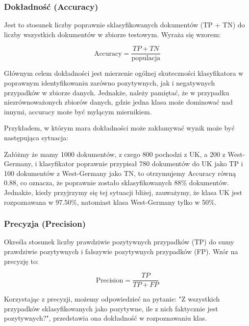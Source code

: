 \documentclass{article}
\begin{document}
\subsubsection*{Dokładność (Accuracy)}
 
Jest to stosunek liczby poprawnie sklasyfikowanych dokumentów (TP + TN) do liczby wszystkich dokumentów w zbiorze testowym. Wyraża się wzorem: \newline
 
\begin{equation}
    \text{Accuracy} = \frac{TP + TN}{\text{populacja}}
\end{equation}


\noindent Głównym celem dokładności jest mierzenie ogólnej skuteczności klasyfikatora w poprawnym identyfikowaniu zarówno pozytywnych, jak i negatywnych przypadków w zbiorze danych. Jednakże, należy pamiętać, że w przypadku niezrównoważonych zbiorów danych, gdzie jedna klasa może dominować nad innymi, accuracy może być mylącym miernikiem. \newline 

\noindent Przykładem, w którym mara dokładności może zakłamywać wynik może być następująca sytuacja: \newline

\noindent Załóżmy że mamy 1000 dokumentów, z czego 800 pochodzi z UK, a 200 z West-Germany, i klasyfikator poprawnie przypisał 780 dokumentów do UK jako TP i 100 dokumentów z West-Germany jako TN, to otrzymujemy Accuracy równą 0.88, co oznacza, że poprawnie zostało sklasyfikowanych 88\% dokumentów. Jednakże, kiedy przyjrzymy się tej sytuacji bliżej, zauważymy, że klasa UK jest rozpoznawana w 97.50\%, natomiast klasa West-Germany tylko w 50\%.

\subsubsection*{Precyzja (Precision)}

Określa stosunek liczby prawdziwie pozytywnych przypadków (TP) do sumy prawdziwie pozytywnych i fałszywie pozytywnych przypadków (FP). Wzór na precyzję to: \newline
 
\begin{equation}
    \text{Precision} = \frac{TP}{TP + FP}
\end{equation}

\noindent Korzystając z precyzji, możemy odpowiedzieć na pytanie: "Z wszystkich przypadków sklasyfikowanych jako pozytywne, ile z nich faktycznie jest pozytywnych?", przedstawia ona dokładność w rozpoznawaniu klas. \newline
\end{document}
